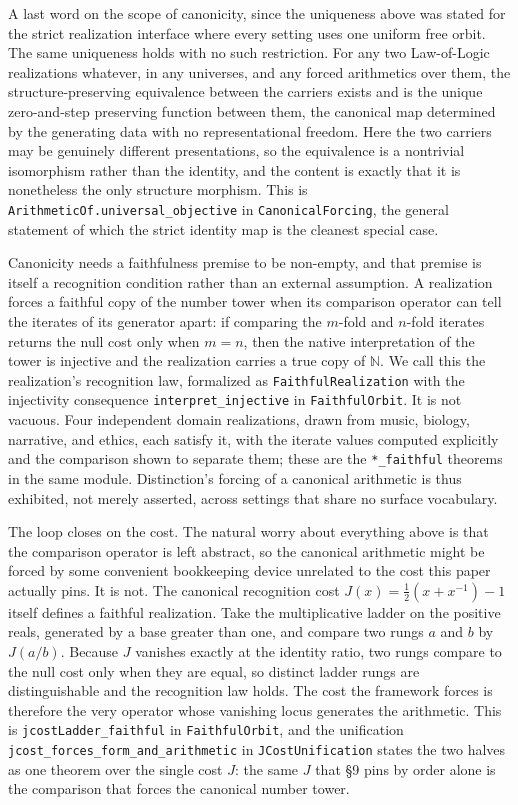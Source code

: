 \documentclass[11pt,a4paper]{article}
\theoremstyle{definition}
\theoremstyle{remark}
\begin{document}
A last word on the scope of canonicity, since the uniqueness above was stated for
the strict realization interface where every setting uses one uniform free orbit.
The same uniqueness holds with no such restriction. For any two Law-of-Logic
realizations whatever, in any universes, and any forced arithmetics over them, the
structure-preserving equivalence between the carriers exists and is the unique
zero-and-step preserving function between them, the canonical map determined by
the generating data with no representational freedom. Here the two carriers may be
genuinely different presentations, so the equivalence is a nontrivial isomorphism
rather than the identity, and the content is exactly that it is nonetheless the
only structure morphism. This is \texttt{ArithmeticOf.universal\_objective} in
\texttt{CanonicalForcing}, the general statement of which the strict identity map
is the cleanest special case.

Canonicity needs a faithfulness premise to be non-empty, and that premise is
itself a recognition condition rather than an external assumption. A realization
forces a faithful copy of the number tower when its comparison operator can tell
the iterates of its generator apart: if comparing the $m$-fold and $n$-fold
iterates returns the null cost only when $m=n$, then the native interpretation of
the tower is injective and the realization carries a true copy of $\mathbb{N}$.
We call this the realization's recognition law, formalized as
\texttt{FaithfulRealization} with the injectivity consequence
\texttt{interpret\_injective} in \texttt{FaithfulOrbit}. It is not vacuous. Four
independent domain realizations, drawn from music, biology, narrative, and ethics,
each satisfy it, with the iterate values computed explicitly and the comparison
shown to separate them; these are the \texttt{*\_faithful} theorems in the same
module. Distinction's forcing of a canonical arithmetic is thus exhibited, not
merely asserted, across settings that share no surface vocabulary.

The loop closes on the cost. The natural worry about everything above is that the
comparison operator is left abstract, so the canonical arithmetic might be forced
by some convenient bookkeeping device unrelated to the cost this paper actually
pins. It is not. The canonical recognition cost $J(x)=\tfrac12(x+x^{-1})-1$ itself
defines a faithful realization. Take the multiplicative ladder on the positive
reals, generated by a base greater than one, and compare two rungs $a$ and $b$ by
$J(a/b)$. Because $J$ vanishes exactly at the identity ratio, two rungs compare to
the null cost only when they are equal, so distinct ladder rungs are
distinguishable and the recognition law holds. The cost the framework forces is
therefore the very operator whose vanishing locus generates the arithmetic. This
is \texttt{jcostLadder\_faithful} in \texttt{FaithfulOrbit}, and the unification
\texttt{jcost\_forces\_form\_and\_arithmetic} in \texttt{JCostUnification} states
the two halves as one theorem over the single cost $J$: the same $J$ that \S9
pins by order alone is the comparison that forces the canonical number tower.
\end{document}
